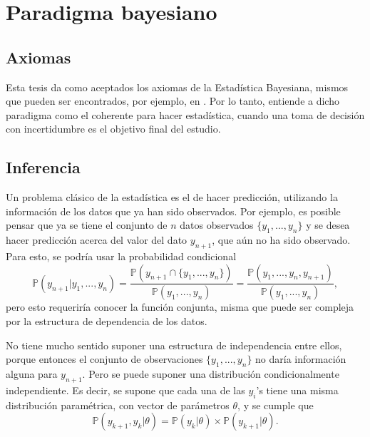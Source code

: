 \chapter[Paradigma bayesiano]{Paradigma bayesiano\raisebox{.3\baselineskip}{\normalsize\footnotemark}}


\section{Axiomas}
Esta tesis da como aceptados los axiomas de la Estad\'istica Bayesiana, mismos que pueden ser encontrados, por ejemplo, en \cite{Fishburn_Axioms}. Por lo tanto, entiende a dicho paradigma como el coherente para hacer estad\'istica, cuando una toma de decisi\'on con incertidumbre es el objetivo final del estudio. 

\section{Inferencia}

Un problema clásico de la estad\'istica es el de hacer predicci\'on, utilizando la informaci\'on de los datos que ya han sido observados. Por ejemplo, es posible pensar que ya se tiene el conjunto de $n$ datos observados $\{y_1, ..., y_n\}$ y se desea hacer predicci\'on acerca del valor del dato $y_{n+1}$, que a\'un no ha sido observado. Para esto, se podr\'ia usar la probabilidad condicional
\begin{equation*}
    \mathbb{P}(y_{n+1}|y_1,...,y_n) =
    \frac{\mathbb{P}(y_{n+1} \cap \{y_1, ..., y_n\})}{\mathbb{P}(y_1, ..., y_n)} =
    \frac{\mathbb{P}(y_1, ..., y_n,y_{n+1})}{\mathbb{P}(y_1, ..., y_n)},
\end{equation*}
pero esto requerir\'ia conocer la funci\'on conjunta, misma que puede ser compleja por la estructura de dependencia de los datos.

No tiene mucho sentido suponer una estructura de independencia entre ellos, porque entonces el conjunto de observaciones $\{y_1, ..., y_n\}$ no dar\'ia informaci\'on alguna para $y_{n+1}$. Pero se puede suponer una distribuci\'on condicionalmente independiente. Es decir, se supone que cada una de las $y_i$'s tiene una misma distribuci\'on param\'etrica, con vector de par\'ametros $\theta$, y se cumple que
\begin{equation*}
    \mathbb{P}(y_{k+1},y_k | \theta) =  \mathbb{P}(y_k | \theta) \times \mathbb{P}(y_{k+1} | \theta).
\end{equation*}

